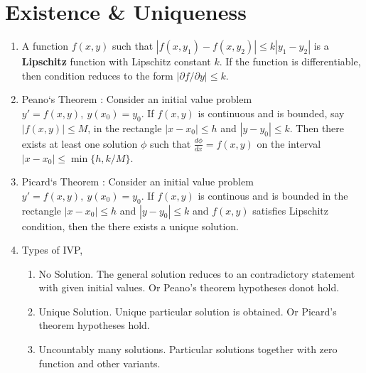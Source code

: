 \section{Existence \& Uniqueness}
\begin{enumerate}
	\item A function $f(x,y)$ such that $|f(x,y_1)-f(x,y_2)| \le k|y_1-y_2|$ is a \textbf{Lipschitz} function with Lipschitz constant $k$. If the function is differentiable, then condition reduces to the form $|\partial f/\partial y| \le k$.
	\item Peano`s Theorem : Consider an initial value problem $y' = f(x,y),\ y(x_0) = y_0$. If $f(x,y)$ is continuous and is bounded, say $|f(x,y)| \le M$, in the rectangle $|x-x_0| \le h$ and $|y-y_0|\le k$. Then there exists at least one solution $\phi$ such that $\frac{d\phi}{dx} = f(x,y)$ on the interval $|x-x_0| \le \min\{ h,k/M \}$. %
	\item Picard`s Theorem : Consider an initial value problem $y' = f(x,y),\ y(x_0) = y_0$. If $f(x,y)$ is continous and is bounded in the rectangle $|x-x_0| \le h$ and $|y-y_0| \le k$ and $f(x,y)$ satisfies Lipschitz condition, then the there exists a unique solution.
	\item Types of IVP,
	\begin{enumerate} 
		\item No Solution. The general solution reduces to an contradictory statement with given initial values. Or Peano's theorem hypotheses donot hold.
		\item Unique Solution. Unique particular solution is obtained. Or Picard's theorem hypotheses hold.
		\item Uncountably many solutions. Particular solutions together with zero function and other variants.
	\end{enumerate}
\end{enumerate}

